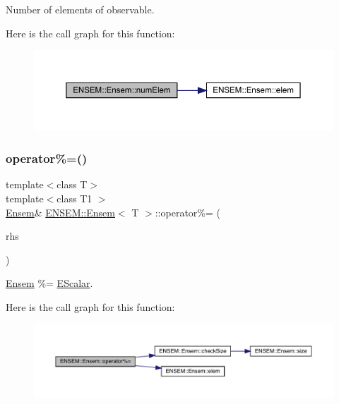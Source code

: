 Number of elements of observable. 

Here is the call graph for this function\+:
\nopagebreak
\begin{figure}[H]
\begin{center}
\leavevmode
\includegraphics[width=350pt]{d7/d3e/classENSEM_1_1Ensem_a495a563176192200eca2f16978158750_cgraph}
\end{center}
\end{figure}
\mbox{\label{classENSEM_1_1Ensem_a8f910ad50fa1625b535bd2456aa7ad64}} 
\subsubsection{\texorpdfstring{operator\%=()}{operator\%=()}\hspace{0.1cm}{\footnotesize\ttfamily [1/3]}}
{\footnotesize\ttfamily template$<$class T$>$ \\
template$<$class T1 $>$ \\
\mbox{\hyperlink{classENSEM_1_1Ensem}{Ensem}}\& \mbox{\hyperlink{classENSEM_1_1Ensem}{E\+N\+S\+E\+M\+::\+Ensem}}$<$ T $>$\+::operator\%= (\begin{DoxyParamCaption}\item[{const \mbox{\hyperlink{classENSEM_1_1EScalar}{E\+Scalar}}$<$ T1 $>$ \&}]{rhs }\end{DoxyParamCaption})\hspace{0.3cm}{\ttfamily [inline]}}



\mbox{\hyperlink{classENSEM_1_1Ensem}{Ensem}} \%= \mbox{\hyperlink{classENSEM_1_1EScalar}{E\+Scalar}}. 

Here is the call graph for this function\+:
\nopagebreak
\begin{figure}[H]
\begin{center}
\leavevmode
\includegraphics[width=350pt]{d7/d3e/classENSEM_1_1Ensem_a8f910ad50fa1625b535bd2456aa7ad64_cgraph}
\end{center}
\end{figure}
\mbox{\label{classENSEM_1_1Ensem_a8f910ad50fa1625b535bd2456aa7ad64}} 
